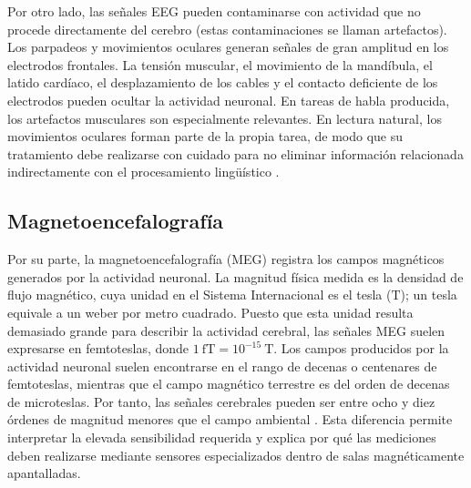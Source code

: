 Por otro lado, las señales EEG pueden contaminarse con actividad que no procede directamente del cerebro (estas contaminaciones se llaman artefactos). Los parpadeos y movimientos oculares generan señales de gran amplitud en los electrodos frontales. La tensión muscular, el movimiento de la mandíbula, el latido cardíaco, el desplazamiento de los cables y el contacto deficiente de los electrodos pueden ocultar la actividad neuronal. En tareas de habla producida, los artefactos musculares son especialmente relevantes. En lectura natural, los movimientos oculares forman parte de la propia tarea, de modo que su tratamiento debe realizarse con cuidado para no eliminar información relacionada indirectamente con el procesamiento lingüístico \cite{delorme2004eeglab}.



\subsection{Magnetoencefalografía}

Por su parte, la magnetoencefalografía (MEG) registra los campos magnéticos generados por la actividad neuronal. La magnitud física medida es la densidad de flujo magnético, cuya unidad en el Sistema Internacional es el tesla (\(\mathrm{T}\)); un tesla equivale a un weber por metro cuadrado. Puesto que esta unidad resulta demasiado grande para describir la actividad cerebral, las señales MEG suelen expresarse en femtoteslas, donde \(1~\mathrm{fT}=10^{-15}~\mathrm{T}\). Los campos producidos por la actividad neuronal suelen encontrarse en el rango de decenas o centenares de femtoteslas, mientras que el campo magnético terrestre es del orden de decenas de microteslas. Por tanto, las señales cerebrales pueden ser entre ocho y diez órdenes de magnitud menores que el campo ambiental \cite{hamalainen1993meg}. Esta diferencia permite interpretar la elevada sensibilidad requerida y explica por qué las mediciones deben realizarse mediante sensores especializados dentro de salas magnéticamente apantalladas.


